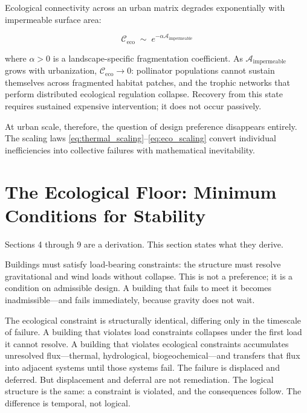 \documentclass[12pt, a4paper]{article}
\theoremstyle{plain}
\theoremstyle{remark}
\begin{document}
Ecological connectivity across an urban matrix degrades exponentially with impermeable surface area:

\begin{equation}
\mathcal{C}_{\text{eco}} \;\sim\; e^{-\alpha \mathcal{A}_{\text{impermeable}}}
\label{eq:eco_scaling}
\end{equation}

\noindent where $\alpha > 0$ is a landscape-specific fragmentation coefficient. As $\mathcal{A}_{\text{impermeable}}$ grows with urbanization, $\mathcal{C}_{\text{eco}} \to 0$: pollinator populations cannot sustain themselves across fragmented habitat patches, and the trophic networks that perform distributed ecological regulation collapse. Recovery from this state requires sustained expensive intervention; it does not occur passively.

At urban scale, therefore, the question of design preference disappears entirely. The scaling laws \eqref{eq:thermal_scaling}--\eqref{eq:eco_scaling} convert individual inefficiencies into collective failures with mathematical inevitability.

\section{The Ecological Floor: Minimum Conditions for Stability}

Sections 4 through 9 are a derivation. This section states what they derive.

Buildings must satisfy load-bearing constraints: the structure must resolve gravitational and wind loads without collapse. This is not a preference; it is a condition on admissible design. A building that fails to meet it becomes inadmissible---and fails immediately, because gravity does not wait.

The ecological constraint is structurally identical, differing only in the timescale of failure. A building that violates load constraints collapses under the first load it cannot resolve. A building that violates ecological constraints accumulates unresolved flux---thermal, hydrological, biogeochemical---and transfers that flux into adjacent systems until those systems fail. The failure is displaced and deferred. But displacement and deferral are not remediation. The logical structure is the same: a constraint is violated, and the consequences follow. The difference is temporal, not logical.
\end{document}
